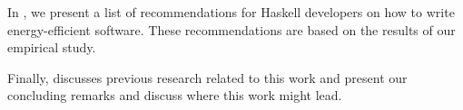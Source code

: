 In \textbf{}, we present a list of recommendations for Haskell developers on how to write energy-efficient software. These recommendations are based on the results of our empirical study.

Finally, \textbf{} discusses previous research related to this work and \textbf{} present our concluding remarks and discuss where this work might lead.
